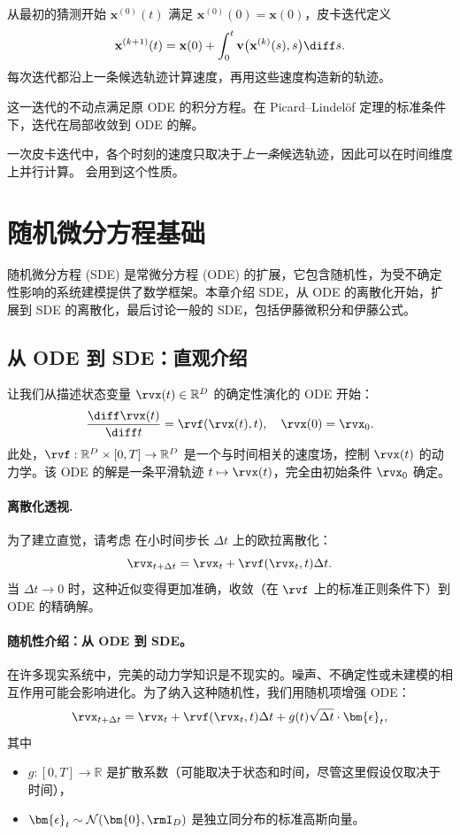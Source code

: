 从最初的猜测开始
$\mathbf{x}^{(0)}(t)$ 满足
$\mathbf{x}^{(0)}(0)=\mathbf{x}(0)$，皮卡迭代定义
\[
\mathbf{x}^{(k+1)}(t)
=
\mathbf{x}(0)
+
\int_0^t
\mathbf{v}
\bigl(
\mathbf{x}^{(k)}(s),s
\bigr)
\diff s.
\]
每次迭代都沿上一条候选轨迹计算速度，再用这些速度构造新的轨迹。

这一迭代的不动点满足原 ODE 的积分方程。在 Picard--Lindel\"of 定理的标准条件下，迭代在局部收敛到 ODE 的解。

一次皮卡迭代中，各个时刻的速度只取决于\emph{上一条}候选轨迹，因此可以在时间维度上并行计算。 会用到这个性质。


\section{随机微分方程基础}\label{app:sde-intro}

随机微分方程 (SDE) 是常微分方程 (ODE) 的扩展，它包含随机性，为受不确定性影响的系统建模提供了数学框架。本章介绍 SDE，从 ODE 的离散化开始，扩展到 SDE 的离散化，最后讨论一般的 SDE，包括伊藤微积分和伊藤公式。

\subsection{从 ODE 到 SDE：直观介绍}
让我们从描述状态变量 $ \rvx(t) \in \mathbb{R}^D $ 的确定性演化的 ODE 开始：
\begin{equation}
    \frac{\diff\rvx(t)}{\diff t} = \rvf(\rvx(t), t), \quad \rvx(0) = \rvx_0.
    \label{eq:ode}
\end{equation}
此处，$ \rvf: \mathbb{R}^D \times [0,T] \rightarrow \mathbb{R}^D $ 是一个与时间相关的速度场，控制 $ \rvx(t) $ 的动力学。该 ODE 的解是一条平滑轨迹 $ t \mapsto \rvx(t) $，完全由初始条件 $ \rvx_0 $ 确定。

\paragraph{离散化透视.} 为了建立直觉，请考虑  在小时间步长 $ \Delta t $ 上的欧拉离散化：
\begin{equation*}
    \rvx_{t+\Delta t} = \rvx_t + \rvf(\rvx_t, t) \Delta t.
\end{equation*}
当 $ \Delta t \to 0 $ 时，这种近似变得更加准确，收敛（在 $ \rvf $ 上的标准正则条件下）到 ODE 的精确解。\paragraph{随机性介绍：从 ODE 到 SDE。} 在许多现实系统中，完美的动力学知识是不现实的。噪声、不确定性或未建模的相互作用可能会影响进化。为了纳入这种随机性，我们用随机项增强 ODE：
\begin{equation}
    \rvx_{t+\Delta t} = \rvx_t + \rvf(\rvx_t, t)\Delta t + g(t)\sqrt{\Delta t} \cdot \bm{\epsilon}_t,
    \label{eq:euler-sde}
\end{equation}
其中
\begin{itemize}
    \item $g: [0,T] \to \mathbb{R}$ 是扩散系数（可能取决于状态和时间，尽管这里假设仅取决于时间），
    \item $\bm{\epsilon}_t \sim \mathcal{N}(\bm{0}, \rmI_D)$ 是独立同分布的标准高斯向量。
\end{itemize}

